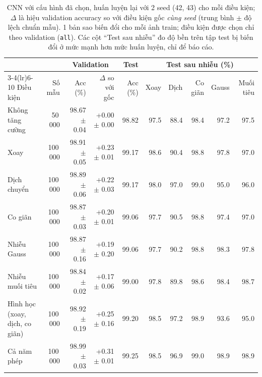 \begin{table}[H]\centering\scriptsize
\setlength{\tabcolsep}{3pt}
\begin{tabular}{lrrrrrrrrr}
\toprule
 & & \multicolumn{2}{c}{Validation} & Test & \multicolumn{5}{c}{Test sau nhiễu (\%)} \\
\cmidrule(lr){3-4}\cmidrule(lr){6-10}
Điều kiện & Số mẫu & Acc (\%) & $\Delta$ so với gốc & Acc (\%) & Xoay & Dịch & Co giãn & Gauss & Muối tiêu \\
\midrule
Không tăng cường & 50\,000 & 98.67 $\pm$ 0.04 & +0.00 $\pm$ 0.00 & 98.82 & 97.5 & 88.4 & 98.4 & 97.2 & 97.5 \\
Xoay & 100\,000 & 98.91 $\pm$ 0.05 & +0.23 $\pm$ 0.01 & 99.17 & 98.6 & 90.4 & 98.8 & 97.8 & 97.0 \\
Dịch chuyển & 100\,000 & 98.89 $\pm$ 0.06 & +0.22 $\pm$ 0.03 & 99.17 & 98.0 & 97.0 & 99.0 & 95.0 & 96.0 \\
Co giãn & 100\,000 & 98.87 $\pm$ 0.03 & +0.20 $\pm$ 0.01 & 99.06 & 97.7 & 90.5 & 98.8 & 97.4 & 97.0 \\
Nhiễu Gauss & 100\,000 & 98.87 $\pm$ 0.16 & +0.19 $\pm$ 0.20 & 99.06 & 97.7 & 90.2 & 98.8 & 98.3 & 97.8 \\
Nhiễu muối tiêu & 100\,000 & 98.84 $\pm$ 0.02 & +0.17 $\pm$ 0.06 & 99.00 & 97.8 & 89.8 & 98.6 & 98.4 & 98.7 \\
Hình học (xoay, dịch, co giãn) & 100\,000 & 98.92 $\pm$ 0.19 & +0.25 $\pm$ 0.16 & 99.20 & 98.5 & 97.2 & 98.9 & 93.6 & 95.0 \\
Cả năm phép & 100\,000 & 98.99 $\pm$ 0.03 & +0.31 $\pm$ 0.01 & 99.25 & 98.5 & 96.9 & 99.0 & 98.9 & 98.9 \\
\bottomrule
\end{tabular}
\caption{CNN với cấu hình đã chọn, huấn luyện lại với 2 seed (42, 43) cho mỗi điều kiện; $\Delta$ là hiệu validation accuracy so với điều kiện gốc \emph{cùng seed} (trung bình $\pm$ độ lệch chuẩn mẫu). 1 bản sao biến đổi cho mỗi ảnh train; điều kiện được chọn chỉ theo validation (\texttt{all}). Các cột ``Test sau nhiễu'' đo độ bền trên tập test bị biến đổi ở mức mạnh hơn mức huấn luyện, chỉ để báo cáo.}
\label{tab:augmentation-cnn}
\end{table}
